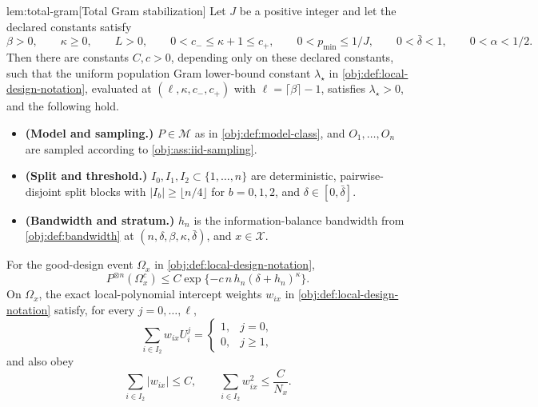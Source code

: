 \documentclass[11pt]{article}
\begin{document}
\begin{lemmav}{lem:total-gram}[Total Gram stabilization]
Let \(J\) be a positive integer and let the declared constants satisfy
\[
\beta>0,\qquad \kappa\ge 0,\qquad L>0,\qquad
0<c_-\le \kappa+1\le c_+,\qquad
0<p_{\min}\le 1/J,\qquad
0<\bar\delta<1,\qquad 0<\alpha<1/2 .
\]
Then there are constants \(C,c>0\), depending only on these declared constants, such that the uniform population Gram lower-bound constant \(\lambda_\star\) in \cref{obj:def:local-design-notation}, evaluated at \((\ell,\kappa,c_-,c_+)\) with \(\ell=\lceil\beta\rceil-1\), satisfies \(\lambda_\star>0\), and the following hold.

\begin{itemize}
\item \textbf{(Model and sampling.)} \(P\in\mathcal M\) as in \cref{obj:def:model-class}, and \(O_1,\ldots,O_n\) are sampled according to \cref{obj:ass:iid-sampling}.
\item \textbf{(Split and threshold.)} \(I_0,I_1,I_2\subset\{1,\ldots,n\}\) are deterministic, pairwise-disjoint split blocks with \(|I_b|\ge \lfloor n/4\rfloor\) for \(b=0,1,2\), and \(\delta\in[0,\bar\delta]\).
\item \textbf{(Bandwidth and stratum.)} \(h_n\) is the information-balance bandwidth from \cref{obj:def:bandwidth} at \((n,\delta,\beta,\kappa,\bar\delta)\), and \(x\in\mathcal X\).
\end{itemize}

For the good-design event \(\Omega_x\) in \cref{obj:def:local-design-notation},
\[
P^{\otimes n}(\Omega_x^c)
\le
C\exp\{-c\,n\,h_n(\delta+h_n)^\kappa\}.
\]
On \(\Omega_x\), the exact local-polynomial intercept weights \(w_{ix}\) in \cref{obj:def:local-design-notation} satisfy, for every \(j=0,\ldots,\ell\),
\[
\sum_{i\in I_2} w_{ix} U_i^j
=
\begin{cases}
1, & j=0,\\
0, & j\ge 1,
\end{cases}
\]
and also obey
\[
\sum_{i\in I_2}|w_{ix}|\le C,
\qquad
\sum_{i\in I_2}w_{ix}^2\le \frac{C}{N_x}.
\]
\end{lemmav}
\end{document}
